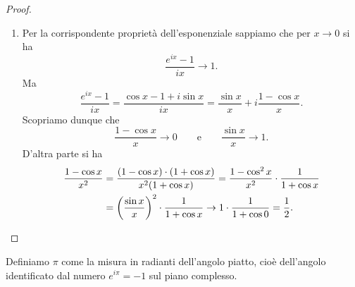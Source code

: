 \begin{proof}
\begin{enumerate}
\item
Per la corrispondente proprietà dell'esponenziale
sappiamo che per $x \to 0$ si ha
\[
  \frac{e^{i x}-1}{i x} \to 1.
\]
Ma
\[
  \frac{e^{ix}-1}{i x}
  = \frac{\cos x - 1 + i \sin x}{i x}
  = \frac{\sin x}{x} + i\frac{1- \cos x}{x}.
\]
Scopriamo dunque che
\[
  \frac{1-\cos x}{x} \to 0
  \qquad\text{e}\qquad
  \frac{\sin x}{x} \to 1.
\]
D'altra parte si ha
\begin{align*}
  \frac{1-\cos x}{x^2}
  &=\frac{(1-\cos x)\cdot(1+\cos x)}{x^2(1+\cos x)}
  = \frac{1-\cos^2 x}{x^2} \cdot \frac{1}{1+\cos x}\\
  &= {\left( \frac{\sin x}{x} \right)}^2\cdot \frac 1{1+\cos x}
  \to 1 \cdot \frac 1 {1+\cos 0} = \frac 1 2.
\end{align*}

\end{enumerate}
\end{proof}

Definiamo $\pi$ come la misura in radianti dell'angolo piatto, 
cioè dell'angolo identificato dal numero $e^{i\pi} = -1$ 
sul piano complesso.

